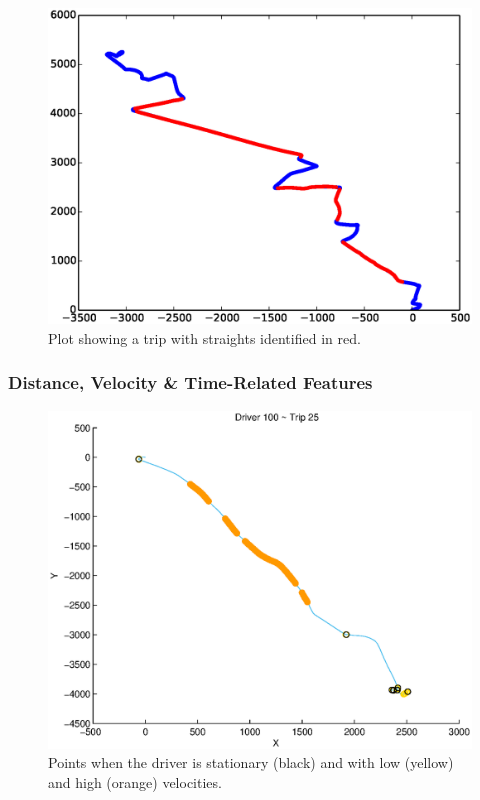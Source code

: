 \documentclass[a4paper, 11pt, twocolumn]{report}
\begin{document}
\begin{figure}[h]
    \center
    \includegraphics[width=\linewidth]{img/straights.eps}
    \caption{Plot showing a trip with straights identified in red.}
    \label{fig:straights}
\end{figure}

\subsubsection{Distance, Velocity \& Time-Related Features}

\begin{figure}[h]
    \center
    \includegraphics[width=\linewidth]{img/speed_highlights.eps}
    \caption{Points when the driver is stationary (black) and with low (yellow) and high (orange) velocities.}
    \label{fig:speedpoints}
\end{figure}
\end{document}

